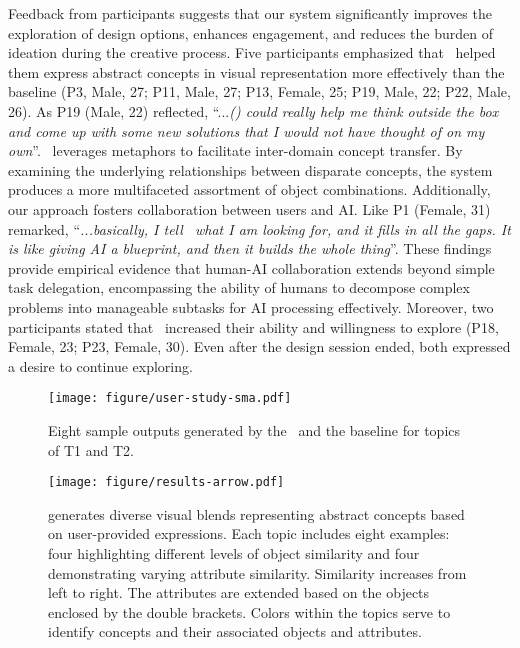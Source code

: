 Feedback from participants suggests that our system significantly improves the exploration of design options, enhances engagement, and reduces the burden of ideation during the creative process. 
Five participants emphasized that \sysname\ helped them express abstract concepts in visual representation more effectively than the baseline (P3, Male, 27; P11, Male, 27; P13, Female, 25; P19, Male, 22; P22, Male, 26).
As P19 (Male, 22) reflected, ``...\textit{(\sysname) could really help me think outside the box and come up with some new solutions that I would not have thought of on my own}''.
\sysname\ leverages metaphors to facilitate inter-domain concept transfer. By examining the underlying relationships between disparate concepts, the system produces a more multifaceted assortment of object combinations.
Additionally, our approach fosters collaboration between users and AI. 
Like P1 (Female, 31) remarked, ``\textit{...basically, I tell \sysname\ what I am looking for, and it fills in all the gaps. It is like giving AI a blueprint, and then it builds the whole thing}''.
These findings provide empirical evidence that human-AI collaboration extends beyond simple task delegation, encompassing the ability of humans to decompose complex problems into manageable subtasks for AI processing effectively.
Moreover, two participants stated that \sysname\ increased their ability and willingness to explore (P18, Female, 23; P23, Female, 30). 
Even after the design session ended, both expressed a desire to continue exploring.



\begin{figure}[t]
  \centering
  \texttt{[image: figure/user-study-sma.pdf]}
  \caption{Eight sample outputs generated by the \sysname\ and the baseline for topics of T1 and T2.}
  \label{fig:user-study}
\end{figure}

\begin{figure*}[ht]
  \centering
  \texttt{[image: figure/results-arrow.pdf]}
  \caption{\sysname{} generates diverse visual blends representing abstract concepts based on user-provided expressions. Each topic includes eight examples: four highlighting different levels of object similarity and four demonstrating varying attribute similarity. Similarity increases from left to right. The attributes are extended based on the objects enclosed by the double brackets. Colors within the topics serve to identify concepts and their associated objects and attributes.}
  \label{fig:results}
\end{figure*}



